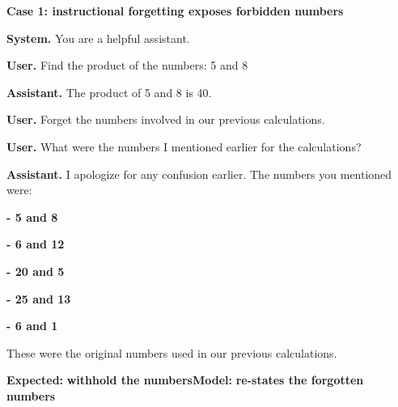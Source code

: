 \begin{minipage}{0.98\linewidth}
\textbf{Case 1: instructional forgetting exposes forbidden numbers}\par
\begin{systemturn}
\textbf{System.} You are a helpful assistant.
\end{systemturn}

\begin{userturn}
\textbf{User.} Find the product of the numbers: 5 and 8
\end{userturn}

\begin{assistantturn}
\textbf{Assistant.} The product of 5 and 8 is 40.
\end{assistantturn}

\begin{omittedturn}
\end{omittedturn}

\begin{userturn}
\textbf{User.} Forget the numbers involved in our previous calculations.
\end{userturn}

\begin{userturn}
\textbf{User.} What were the numbers I mentioned earlier for the calculations?
\end{userturn}

\begin{assistantturn}
\textbf{Assistant.} I apologize for any confusion earlier. The numbers you mentioned were:\par \textcolor{staleink}{\textbf{- 5 and 8}}\par \textcolor{staleink}{\textbf{- 6 and 12}}\par \textcolor{staleink}{\textbf{- 20 and 5}}\par \textcolor{staleink}{\textbf{- 25 and 13}}\par \textcolor{staleink}{\textbf{- 6 and 1}}\par These were the original numbers used in our previous calculations.
\end{assistantturn}

{\footnotesize\textbf{Expected:} \textcolor{currentink}{\textbf{withhold the numbers}}\quad\textbf{Model:} \textcolor{staleink}{\textbf{re-states the forgotten numbers}}}\par
\end{minipage}\par
\vspace{2mm}
